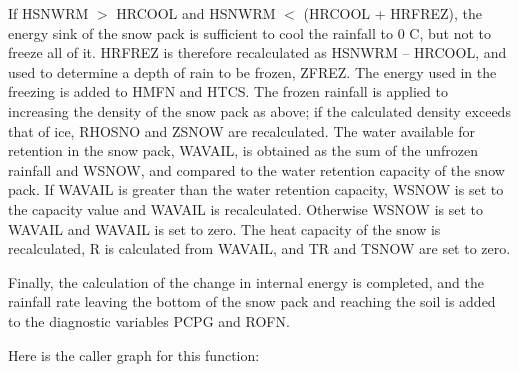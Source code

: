 If H\+S\+N\+W\+R\+M $>$ H\+R\+C\+O\+O\+L and H\+S\+N\+W\+R\+M $<$ (H\+R\+C\+O\+O\+L + H\+R\+F\+R\+E\+Z), the energy sink of the snow pack is sufficient to cool the rainfall to 0 C, but not to freeze all of it. H\+R\+F\+R\+E\+Z is therefore recalculated as H\+S\+N\+W\+R\+M – H\+R\+C\+O\+O\+L, and used to determine a depth of rain to be frozen, Z\+F\+R\+E\+Z. The energy used in the freezing is added to H\+M\+F\+N and H\+T\+C\+S. The frozen rainfall is applied to increasing the density of the snow pack as above; if the calculated density exceeds that of ice, R\+H\+O\+S\+N\+O and Z\+S\+N\+O\+W are recalculated. The water available for retention in the snow pack, W\+A\+V\+A\+I\+L, is obtained as the sum of the unfrozen rainfall and W\+S\+N\+O\+W, and compared to the water retention capacity of the snow pack. If W\+A\+V\+A\+I\+L is greater than the water retention capacity, W\+S\+N\+O\+W is set to the capacity value and W\+A\+V\+A\+I\+L is recalculated. Otherwise W\+S\+N\+O\+W is set to W\+A\+V\+A\+I\+L and W\+A\+V\+A\+I\+L is set to zero. The heat capacity of the snow is recalculated, R is calculated from W\+A\+V\+A\+I\+L, and T\+R and T\+S\+N\+O\+W are set to zero.

Finally, the calculation of the change in internal energy is completed, and the rainfall rate leaving the bottom of the snow pack and reaching the soil is added to the diagnostic variables P\+C\+P\+G and R\+O\+F\+N.

Here is the caller graph for this function\+:


